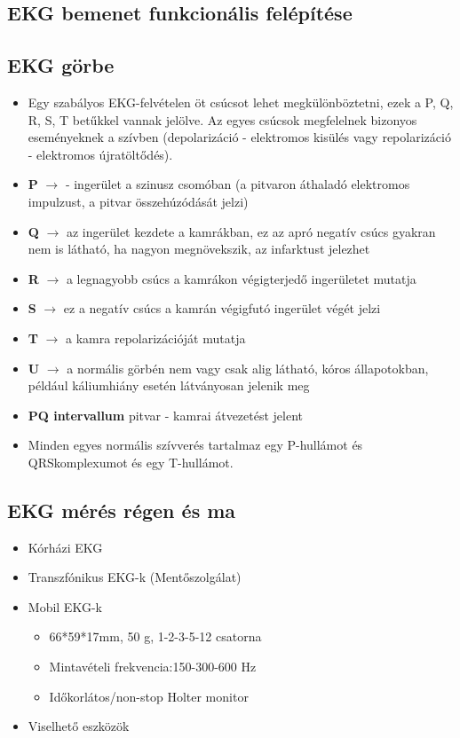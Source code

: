 \subsection{EKG bemenet funkcionális felépítése}

\clearpage
\subsection{EKG görbe}

\begin{itemize}
    \item Egy szabályos EKG-felvételen öt csúcsot lehet megkülönböztetni, ezek a P, Q, R,
    S, T betűkkel vannak jelölve. Az egyes csúcsok megfelelnek bizonyos
    eseményeknek a szívben (depolarizáció - elektromos kisülés vagy repolarizáció
    - elektromos újratöltődés).
    \item \textbf{P} $\rightarrow$ - ingerület a szinusz csomóban (a pitvaron áthaladó elektromos impulzust, a
    pitvar összehúzódását jelzi)
    \item \textbf{Q} $\rightarrow$ az ingerület kezdete a kamrákban, ez az apró negatív csúcs gyakran nem is
    látható, ha nagyon megnövekszik, az infarktust jelezhet
    \item \textbf{R} $\rightarrow$ a legnagyobb csúcs a kamrákon végigterjedő ingerületet mutatja
    \item \textbf{S} $\rightarrow$ ez a negatív csúcs a kamrán végigfutó ingerület végét jelzi
    \item \textbf{T} $\rightarrow$ a kamra repolarizációját mutatja
    \item \textbf{U} $\rightarrow$ a normális görbén nem vagy csak alig látható, kóros állapotokban, például
    káliumhiány esetén látványosan jelenik meg
    \item \textbf{PQ intervallum} pitvar - kamrai átvezetést jelent
    \item Minden egyes normális szívverés tartalmaz egy P-hullámot és QRSkomplexumot és egy T-hullámot.
\end{itemize}

\clearpage
\subsection{EKG mérés régen és ma}
\begin{itemize}
    \item Kórházi EKG
    \item Transzfónikus EKG-k (Mentőszolgálat)
    \item Mobil EKG-k
    \begin{itemize}
        \item 66*59*17mm, 50 g, 1-2-3-5-12 csatorna
        \item Mintavételi frekvencia:150-300-600 Hz
        \item Időkorlátos/non-stop Holter monitor
    \end{itemize}
    \item Viselhető eszközök
\end{itemize}


